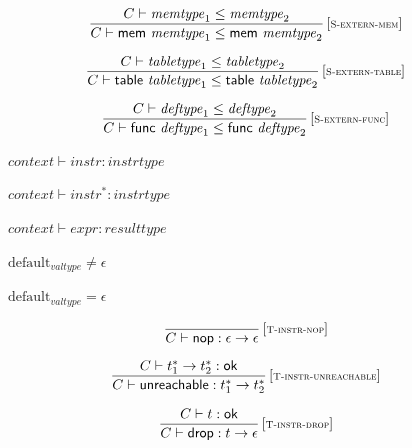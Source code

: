 $$
\begin{array}{@{}c@{}}\displaystyle
\frac{
C \vdash {\mathit{memtype}}_1 \leq {\mathit{memtype}}_2
}{
C \vdash \mathsf{mem}~{\mathit{memtype}}_1 \leq \mathsf{mem}~{\mathit{memtype}}_2
} \, {[\textsc{\scriptsize S{-}extern{-}mem}]}
\qquad
\end{array}
$$

$$
\begin{array}{@{}c@{}}\displaystyle
\frac{
C \vdash {\mathit{tabletype}}_1 \leq {\mathit{tabletype}}_2
}{
C \vdash \mathsf{table}~{\mathit{tabletype}}_1 \leq \mathsf{table}~{\mathit{tabletype}}_2
} \, {[\textsc{\scriptsize S{-}extern{-}table}]}
\qquad
\end{array}
$$

$$
\begin{array}{@{}c@{}}\displaystyle
\frac{
C \vdash {\mathit{deftype}}_1 \leq {\mathit{deftype}}_2
}{
C \vdash \mathsf{func}~{\mathit{deftype}}_1 \leq \mathsf{func}~{\mathit{deftype}}_2
} \, {[\textsc{\scriptsize S{-}extern{-}func}]}
\qquad
\end{array}
$$

$\boxed{{\mathit{context}} \vdash {\mathit{instr}} : {\mathit{instrtype}}}$

$\boxed{{\mathit{context}} \vdash {{\mathit{instr}}^\ast} : {\mathit{instrtype}}}$

$\boxed{{\mathit{context}} \vdash {\mathit{expr}} : {\mathit{resulttype}}}$

$\boxed{{{\mathrm{default}}}_{{\mathit{valtype}}} \neq \epsilon}$

$\boxed{{{\mathrm{default}}}_{{\mathit{valtype}}} = \epsilon}$

\vspace{1ex}

$$
\begin{array}{@{}c@{}}\displaystyle
\frac{
}{
C \vdash \mathsf{nop} : \epsilon \rightarrow \epsilon
} \, {[\textsc{\scriptsize T{-}instr{-}nop}]}
\qquad
\end{array}
$$

$$
\begin{array}{@{}c@{}}\displaystyle
\frac{
C \vdash {t_1^\ast} \rightarrow {t_2^\ast} : \mathsf{ok}
}{
C \vdash \mathsf{unreachable} : {t_1^\ast} \rightarrow {t_2^\ast}
} \, {[\textsc{\scriptsize T{-}instr{-}unreachable}]}
\qquad
\end{array}
$$

$$
\begin{array}{@{}c@{}}\displaystyle
\frac{
C \vdash t : \mathsf{ok}
}{
C \vdash \mathsf{drop} : t \rightarrow \epsilon
} \, {[\textsc{\scriptsize T{-}instr{-}drop}]}
\qquad
\end{array}
$$

